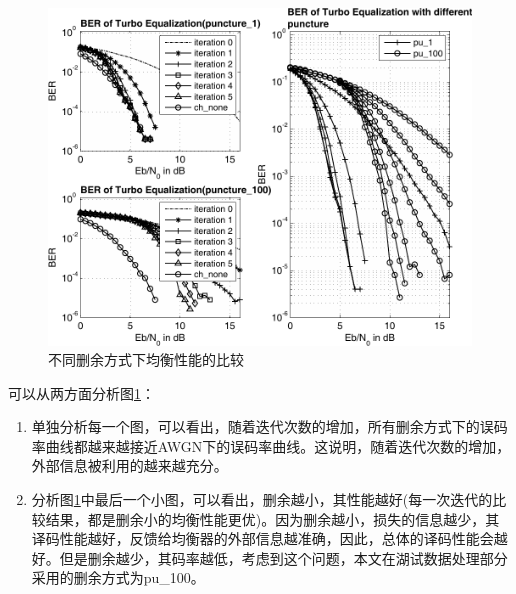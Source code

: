 \begin{figure}[htb]
  \begin{center}
    \includegraphics[width=\textwidth]{images/different_puncture_separate_bw.pdf}
  \end{center}
  \caption{不同删余方式下均衡性能的比较}
  \label{fig:3.6}
\end{figure}

可以从两方面分析图\ref{fig:3.6}：
\begin{enumerate}
    \item
        单独分析每一个图，可以看出，随着迭代次数的增加，所有删余方式下的误码率曲线都越来越接近AWGN下的误码率曲线。这说明，随着迭代次数的增加，外部信息被利用的越来越充分。
    \item
        分析图\ref{fig:3.6}中最后一个小图，可以看出，删余越小，其性能越好(每一次迭代的比较结果，都是删余小的均衡性能更优)。因为删余越小，损失的信息越少，其译码性能越好，反馈给均衡器的外部信息越准确，因此，总体的译码性能会越好。但是删余越少，其码率越低，考虑到这个问题，本文在湖试数据处理部分采用的删余方式为pu\_100。
\end{enumerate}

